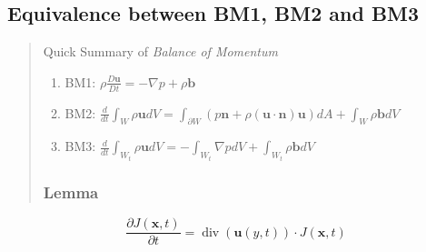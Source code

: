 \subsection{Equivalence between BM1, BM2 and BM3} %


\begin{quote}
	Quick Summary of \textit{Balance of Momentum}
\begin{enumerate}
	\item BM1: $\displaystyle \rho \frac{D\textbf{u}}{Dt} = -\nabla p + \rho \textbf{b}$
	\item BM2: $\displaystyle \frac{d}{dt}\int_{W}\rho \textbf{u} dV = \int_{\partial W} \left(p\textbf{n} + \rho (\textbf{u}\cdot \textbf{n})\textbf{u}\right) dA + \int_{W} \rho \textbf{b} dV$
	\item BM3: $\displaystyle \frac{d}{dt} \int_{W_t} \rho \textbf{u} dV = -\int_{W_t} \nabla pdV + \int_{W_t} \rho \textbf{b}dV$

\end{enumerate}
\subsubsection{Lemma} %

\end{quote}

\begin{equation}
\frac{\partial J(\textbf{x},t)}{\partial t} = \operatorname{div}(\textbf{u}(y,t)) \cdot J(\textbf{x},t)
\end{equation}


